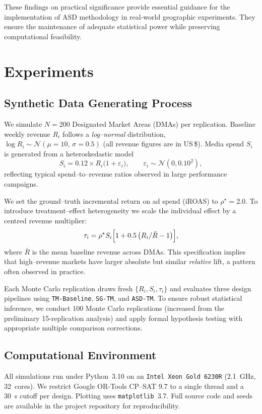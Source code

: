 \documentclass[final,3p,fleqn, 10pt]{elsarticle}
\begin{document}
These findings on practical significance provide essential guidance for the implementation of ASD methodology in real-world geographic experiments. They ensure the maintenance of adequate statistical power while preserving computational feasibility.

\section{Experiments}
\label{sec:experiments}


\subsection{Synthetic Data Generating Process}
We simulate $N=200$ Designated Market Areas (DMAs) per replication. Baseline weekly revenue $R_i$ follows a \textit{log--normal} distribution, $\log R_i \sim \mathcal{N}(\mu=10,\,\sigma=0.5)$ (all revenue figures are in US\,\$). Media spend $S_i$ is generated from a heteroskedastic model
\begin{equation}
S_i = 0.12 \times R_i\bigl(1 + \varepsilon_i\bigr), \qquad \varepsilon_i \sim \mathcal{N}(0,0.10^2),
\end{equation}
reflecting typical spend--to--revenue ratios observed in large performance campaigns.

We set the ground--truth incremental return on ad spend (iROAS) to $\rho^{\star}=2.0$.  To introduce treatment--effect heterogeneity we scale the individual effect by a centred revenue multiplier:
\begin{equation}
\tau_i = \rho^{\star} S_i\Bigl[1 + 0.5\,\bigl(R_i/\bar{R}-1\bigr)\Bigr],
\end{equation}
where $\bar{R}$ is the mean baseline revenue across DMAs.  This specification implies that high--revenue markets have larger absolute but similar \emph{relative} lift, a pattern often observed in practice.

Each Monte Carlo replication draws fresh $\{R_i,S_i,\tau_i\}$ and evaluates three design pipelines using \texttt{TM-Baseline}, \texttt{SG-TM}, and \texttt{ASD-TM}. To ensure robust statistical inference, we conduct 100 Monte Carlo replications (increased from the preliminary 15-replication analysis) and apply formal hypothesis testing with appropriate multiple comparison corrections.

\subsection{Computational Environment}
All simulations run under Python~3.10 on an \texttt{Intel Xeon Gold~6230R} (2.1~GHz, 32~cores).  We restrict Google OR-Tools CP--SAT 9.7 to a single thread and a 30~s cutoff per design. Plotting uses \texttt{matplotlib}~3.7.  Full source code and seeds are available in the project repository for reproducibility.
\end{document}
